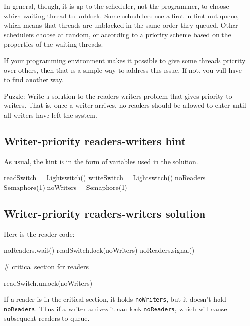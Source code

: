 \documentclass{book}
\begin{document}
In general, though, it is up to the scheduler, not the programmer,
to choose which waiting thread to unblock.
Some schedulers use a first-in-first-out queue, which means
that threads are unblocked in the same order they queued.
Other schedulers choose at random, or according to
a priority scheme based on the properties of the waiting
threads.

If your programming environment makes it possible to give
some threads priority over others, then that is a simple way
to address this issue.  If not, you will have to find another
way.

Puzzle: Write a solution to the readers-writers problem that gives
priority to writers.  That is, once a writer arrives, no readers
should be allowed to enter until all writers have left the system.



{\subsection{Writer-priority readers-writers hint}}

As usual, the hint is in the form of variables
used in the solution.

\begin{unbreakable}[title={Writer-priority readers-writers initialization}]{}
readSwitch = Lightswitch()
writeSwitch = Lightswitch()
noReaders = Semaphore(1)
noWriters = Semaphore(1)
\end{unbreakable}



\subsection{Writer-priority readers-writers solution}

Here is the reader code:

\begin{unbreakable}[title={Writer-priority reader solution}]{}
noReaders.wait()
    readSwitch.lock(noWriters)
noReaders.signal()

    # critical section for readers

readSwitch.unlock(noWriters)
\end{unbreakable}

If a reader is in the critical section, it holds
    {\tt noWriters}, but it doesn't hold {\tt noReaders}.
Thus if a writer arrives it can lock {\tt noReaders},
which will cause subsequent readers to queue.
\end{document}
